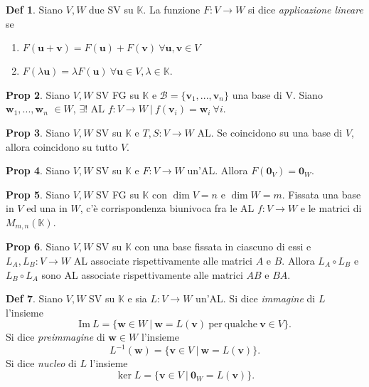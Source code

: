 \documentclass[]{article}
\newcommand{\bl}[1]{\mathbf{#1}}
\newcommand{\vu}{\mathbf{u}}
\newcommand{\vv}{\mathbf{v}}
\newcommand{\vw}{\mathbf{w}}
\theoremstyle{definition}
\theoremstyle{definition}
\newtheorem{prop}{Prop}[subsection]
\theoremstyle{definition}
\newtheorem{dfn}[prop]{Def}
\begin{document}
\begin{dfn} Siano $V,W$ due SV su $\mathbb{K}$. La funzione $F:V \to W$ si dice \emph{applicazione lineare} se
\begin{enumerate}
	\item $F(\vu+\vv)=F(\vu)+F(\vv) \ \forall \vu,\vv \in V$
	\item $F(\lambda \vu)= \lambda F(\vu) \ \forall \vu \in V, \lambda \in \mathbb{K}$.
\end{enumerate}

\end{dfn} \begin{prop} Siano $V,W$ SV FG su $\mathbb{K}$ e $\mathcal{B} = \{ \vv _1 ,..., \vv _n \}$ una base di V. Siano $\vw _1 ,..., \vw _n $ $\in W$, $\exists !$ AL $f: V \to W \ | \ f( \vv _i ) = \vw _i \ \forall i$.

\end{prop} \begin{prop} Siano $V,W$ SV su $\mathbb{K}$ e $T,S: V \to W$ AL. Se coincidono su una base di $V$, allora coincidono su tutto $V$.

\end{prop} \begin{prop} Siano $V,W$ SV su $\mathbb{K}$ e $F:V \to W$ un'AL. Allora $F(\bl{0}_V ) = \bl{0}_W$.

\end{prop} \begin{prop} Siano $V,W$ SV FG su $\mathbb{K}$ con $\dim V=n$ e $\dim W=m$. Fissata una base in $V$ ed una in $W$, c'è corrispondenza biunivoca fra le AL $f: V \to W$ e le matrici di $M_{m,n} (\mathbb{K})$.

\end{prop} \begin{prop} Siano $V,W$ SV su $\mathbb{K}$ con una base fissata in ciascuno di essi e $L_A,L_B: V \to W$ AL associate rispettivamente alle matrici $A$ e $B$. Allora $L_A \circ L_B$ e $L_B \circ L_A$ sono AL associate rispettivamente alle matrici $AB$ e $BA$.

\end{prop} \begin{dfn} Siano $V,W$ SV su $\mathbb{K}$ e sia $L:V \to W$ un'AL. Si dice \emph{immagine} di $L$ l'insieme
$$\mathrm{Im}\ L = \{ \vw \in W \ | \ \vw = L(\vv) \ \mathrm{per\ qualche}\ \vv \in V \}.$$
Si dice \emph{preimmagine} di $\vw \in W$ l'insieme
$$L^{-1}(\vw) = \{ \vv \in V \ | \ \vw = L(\vv) \}.$$
Si dice \emph{nucleo} di $L$ l'insieme
$$\ker L = \{ \vv \in V \ | \ \bl{0}_W = L(\vv) \}.$$


\end{dfn}
\end{document}
